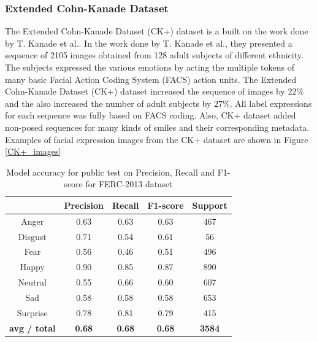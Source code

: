 \documentclass[master]{thesis-uestc}
\begin{document}
\subsubsection{Extended Cohn-Kanade Dataset}
The Extended Cohn-Kanade Dataset (CK+) dataset is a built on the work done by T. Kanade et al.\cite{ck_840611}. In the work done by T. Kanade et al.\cite{ck_840611}, they presented a sequence of 2105 images obtained from 128 adult subjects of different ethnicity. The subjects expressed the various emotions by acting the multiple tokens of many basic Facial Action Coding System (FACS)\cite{ekman_facs} action units. The Extended Cohn-Kanade Dataset (CK+) dataset increased the sequence of images by $22\%$ and the also increased the number of adult subjects by $27\%$. All label expressions for each sequence was fully based on FACS coding. Also, CK+ dataset added non-posed sequences for many kinds of smiles and their corresponding metadata. Examples of facial expression images from the CK+ dataset are shown in Figure \ref{CK+_images}

\begin{table}[ht]
\renewcommand{\arraystretch}{1.3}
\caption{Model accuracy for public test on Precision, Recall and F1-score for FERC-2013 dataset}
\label{table_fer2013_scores_public}
\begin{center}
\begin{tabular}{|c|c|c|c|c|}

\hline
 & Precision & Recall & F1-score & Support\\ \hline

Anger & 0.63 & 0.63 & 0.63 & 467\\ \hline
Disgust & 0.71 & 0.54 & 0.61 & 56\\ \hline
Fear & 0.56 & 0.46 & 0.51 & 496\\ \hline
Happy & 0.90 & 0.85 & 0.87 & 890\\ \hline
Neutral & 0.55 & 0.66 & 0.60 & 607\\ \hline
Sad & 0.58 & 0.58 & 0.58 & 653\\ \hline
Surprise & 0.78 & 0.81 & 0.79 & 415\\ \hline

\textbf{avg / total} & \textbf{0.68} & \textbf{0.68} & \textbf{0.68} & \textbf{3584}\\ \hline

\end{tabular}
\end{center}
\end{table}
\end{document}
